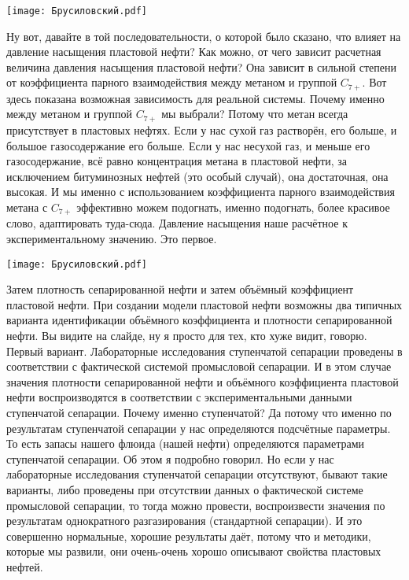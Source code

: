 \documentclass[main.tex]{subfiles}
\begin{document}
\begin{center}
\texttt{[image: Брусиловский.pdf]}
\end{center}

Ну вот, давайте в той последовательности, о которой было сказано, что влияет на давление насыщения пластовой нефти?
Как можно, от чего зависит расчетная величина давления насыщения пластовой нефти?
Она зависит в сильной степени от коэффициента парного взаимодействия между метаном и группой $C_{7+}$.
Вот здесь показана возможная зависимость для реальной системы.
Почему именно между метаном и группой $C_{7+}$ мы выбрали?
Потому что метан всегда присутствует в пластовых нефтях.
Если у нас сухой газ растворён, его больше, и большое газосодержание его больше.
Если у нас несухой газ, и меньше его газосодержание, всё равно концентрация метана в пластовой нефти, за исключением битуминозных нефтей (это особый случай), она достаточная, она высокая.
И мы именно с использованием коэффициента парного взаимодействия метана с $C_{7+}$ эффективно можем подогнать, именно подогнать, более красивое слово, адаптировать туда-сюда.
Давление насыщения наше расчётное к экспериментальному значению.
Это первое.

\begin{center}
\texttt{[image: Брусиловский.pdf]}
\end{center}

Затем плотность сепарированной нефти и затем объёмный коэффициент пластовой нефти.
При создании модели пластовой нефти возможны два типичных варианта идентификации объёмного коэффициента и плотности сепарированной нефти.
Вы видите на слайде, ну я просто для тех, кто хуже видит, говорю.
Первый вариант.
Лабораторные исследования ступенчатой сепарации проведены в соответствии с фактической системой промысловой сепарации.
И в этом случае значения плотности сепарированной нефти и объёмного коэффициента пластовой нефти воспроизводятся в соответствии с экспериментальными данными ступенчатой сепарации.
Почему именно ступенчатой?
Да потому что именно по результатам ступенчатой сепарации у нас определяются подсчётные параметры.
То есть запасы нашего флюида (нашей нефти) определяются параметрами ступенчатой сепарации.
Об этом я подробно говорил.
Но если у нас лабораторные исследования ступенчатой сепарации отсутствуют, бывают такие варианты, либо проведены при отсутствии данных о фактической системе промысловой сепарации, то тогда можно провести, воспроизвести значения по результатам однократного разгазирования (стандартной сепарации).
И это совершенно нормальные, хорошие результаты даёт, потому что и методики, которые мы развили, они очень-очень хорошо описывают свойства пластовых нефтей.
\end{document}
